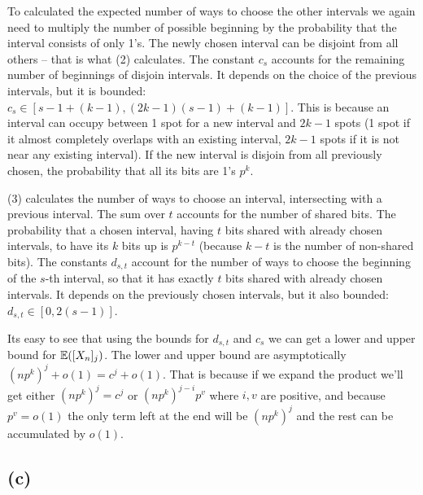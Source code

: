 \documentclass[a4paper]{article}
\begin{document}
To calculated the expected number of ways to choose the other intervals we
again need to multiply the number of possible beginning by the probability that
the interval consists of only 1's. The newly chosen interval can be disjoint
from all others -- that is what (2) calculates. The constant $ c_s $ accounts
for the remaining number of beginnings of disjoin intervals.  It depends on the
choice of the previous intervals, but it is bounded: $ c_s \in [s-1 + (k-1),
(2k-1)(s-1) + (k-1)] $.  This is because an interval can occupy between 1 spot
for a new interval and $ 2k-1 $ spots (1 spot if it almost completely overlaps
with an existing interval, $ 2k-1 $ spots if it is not near any existing
interval). If the new interval is disjoin from all previously chosen, the
probability that all its bits are 1's $ p^k $.

(3) calculates the number of ways to choose an interval, intersecting with
a previous interval. The sum over $ t $ accounts for the number of shared bits.
The probability that a chosen interval, having $ t $ bits shared with already
chosen intervals, to have its $ k $ bits up is $ p^{k-t} $ (because $ k-t $ is
the number of non-shared bits). The constants $ d_{s,t} $ account for the
number of ways to choose the beginning of the $s$-th interval, so that it has
exactly $ t $ bits shared with already chosen intervals. It depends on the
previously chosen intervals, but it also bounded: $ d_{s, t} \in [0, 2(s-1)] $.

Its easy to see that using the bounds for $ d_{s,t} $ and $ c_s $ we can get
a lower and upper bound for $ \mathbb{E}([X_n]_j) $. The lower and upper bound are
asymptotically $ (np^k)^j + o(1) = c^j + o(1) $. That is because if we expand
the product we'll get either $ (np^k)^j = c^j $ or $ (np^k)^{j-i}p^v $ where
$ i, v $ are positive, and because $ p^v = o(1) $ the only term left at the end
will be $ (np^k)^j $ and the rest can be accumulated by $ o(1) $.

\subsection*{(c)}
\end{document}

